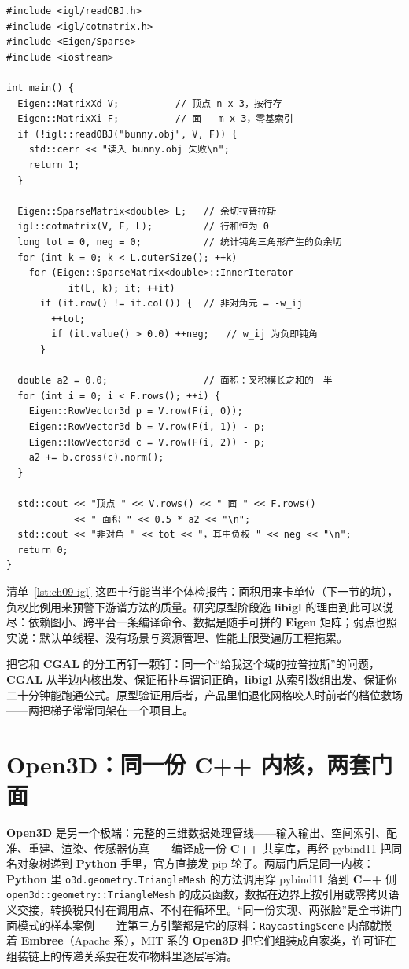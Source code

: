 \documentclass[12pt,a4paper,fontset=fandol]{ctexbook}
\newcommand{\Tp}[1]{\texttt{#1}}
\newcommand{\Bk}{\allowbreak}
\newcommand{\Lib}[1]{\textbf{#1}}
\newcommand{\Lang}[1]{\textsf{\bfseries #1}}
\newcommand{\CPP}{\Lang{C++}}
\newcommand{\PY}{\Lang{Python}}
\begin{document}
\begin{lstlisting}[style=cppstyle,caption={\Lib{libigl}：读 OBJ、组装余切拉普拉斯并检查负权与面积},label={lst:ch09-igl}]
#include <igl/readOBJ.h>
#include <igl/cotmatrix.h>
#include <Eigen/Sparse>
#include <iostream>

int main() {
  Eigen::MatrixXd V;          // 顶点 n x 3，按行存
  Eigen::MatrixXi F;          // 面   m x 3，零基索引
  if (!igl::readOBJ("bunny.obj", V, F)) {
    std::cerr << "读入 bunny.obj 失败\n";
    return 1;
  }

  Eigen::SparseMatrix<double> L;   // 余切拉普拉斯
  igl::cotmatrix(V, F, L);         // 行和恒为 0
  long tot = 0, neg = 0;           // 统计钝角三角形产生的负余切
  for (int k = 0; k < L.outerSize(); ++k)
    for (Eigen::SparseMatrix<double>::InnerIterator
           it(L, k); it; ++it)
      if (it.row() != it.col()) {  // 非对角元 = -w_ij
        ++tot;
        if (it.value() > 0.0) ++neg;   // w_ij 为负即钝角
      }

  double a2 = 0.0;                 // 面积：叉积模长之和的一半
  for (int i = 0; i < F.rows(); ++i) {
    Eigen::RowVector3d p = V.row(F(i, 0));
    Eigen::RowVector3d b = V.row(F(i, 1)) - p;
    Eigen::RowVector3d c = V.row(F(i, 2)) - p;
    a2 += b.cross(c).norm();
  }

  std::cout << "顶点 " << V.rows() << " 面 " << F.rows()
            << " 面积 " << 0.5 * a2 << "\n";
  std::cout << "非对角 " << tot << "，其中负权 " << neg << "\n";
  return 0;
}
\end{lstlisting}

清单~\ref{lst:ch09-igl} 这四十行能当半个体检报告：面积用来卡单位（下一节的坑），负权比例用来预警下游谱方法的质量。研究原型阶段选 \Lib{libigl} 的理由到此可以说尽：依赖图小、跨平台一条编译命令、数据是随手可拼的 \Lib{Eigen} 矩阵；弱点也照实说：默认单线程、没有场景与资源管理、性能上限受遍历工程拖累。

把它和 \Lib{CGAL} 的分工再钉一颗钉：同一个``给我这个域的拉普拉斯''的问题，\Lib{CGAL} 从半边内核出发、保证拓扑与谓词正确，\Lib{libigl} 从索引数组出发、保证你二十分钟能跑通公式。原型验证用后者，产品里怕退化网格咬人时前者的档位救场——两把梯子常常同架在一个项目上。

\section{\Lib{Open3D}：同一份 \CPP{} 内核，两套门面}

\Lib{Open3D} 是另一个极端：完整的三维数据处理管线——输入输出、空间索引、配准、重建、渲染、传感器仿真——编译成一份 \CPP{} 共享库，再经 pybind11 把同名对象树递到 \PY{} 手里，官方直接发 pip 轮子。两扇门后是同一内核：\PY{} 里 \Tp{o3d.{\Bk}geometry.{\Bk}Triangle{\Bk}Mesh} 的方法调用穿 pybind11 落到 \CPP{} 侧 \Tp{open3d::{\Bk}geometry::{\Bk}Triangle{\Bk}Mesh} 的成员函数，数据在边界上按引用或零拷贝语义交接，转换税只付在调用点、不付在循环里。``同一份实现、两张脸''是全书讲门面模式的样本案例——连第三方引擎都是它的原料：\Tp{Raycasting{\Bk}Scene} 内部就嵌着 \Lib{Embree}（Apache 系），MIT 系的 \Lib{Open3D} 把它们组装成自家类，许可证在组装链上的传递关系要在发布物料里逐层写清。
\end{document}
